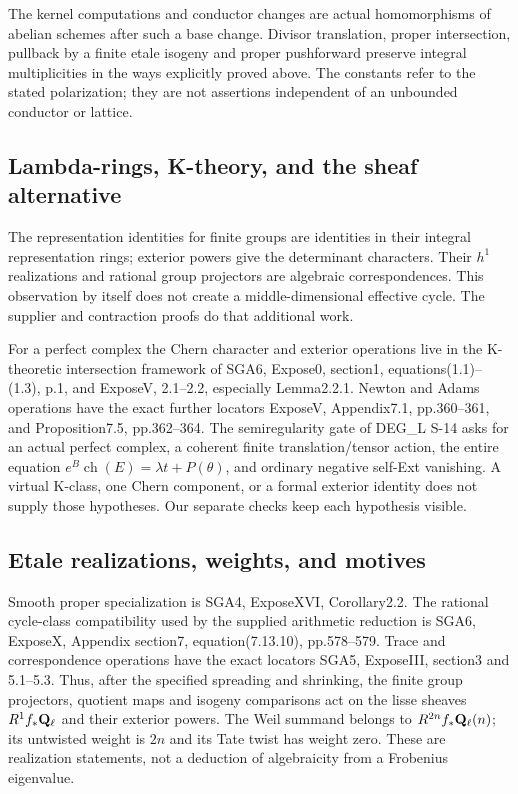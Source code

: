 The kernel computations and conductor changes are actual homomorphisms
of abelian schemes after such a base change. Divisor translation,
proper intersection, pullback by a finite etale isogeny and proper
pushforward preserve integral multiplicities in the ways explicitly
proved above. The constants refer to the stated polarization; they
are not assertions independent of an unbounded conductor or lattice.

\subsection{Lambda-rings, K-theory, and the sheaf alternative}
The representation identities for finite groups are identities in
their integral representation rings; exterior powers give the
determinant characters. Their $h^1$ realizations and rational group
projectors are algebraic correspondences. This observation by itself
does not create a middle-dimensional effective cycle. The supplier
and contraction proofs do that additional work.

For a perfect complex the Chern character and exterior operations live
in the K-theoretic intersection framework of SGA6, Expose0, section1,
equations(1.1)--(1.3), p.1, and ExposeV, 2.1--2.2, especially
Lemma2.2.1. Newton and Adams operations have the exact further
locators ExposeV, Appendix7.1, pp.360--361, and Proposition7.5,
pp.362--364. The semiregularity gate of DEG\_L S-14 asks for an actual
perfect complex, a coherent finite translation/tensor action, the
entire equation $e^B\operatorname{ch}(E)=\lambda t+P(\theta)$, and
ordinary negative self-Ext vanishing. A virtual K-class, one Chern
component, or a formal exterior identity does not supply those
hypotheses. Our separate checks keep each hypothesis visible.

\subsection{Etale realizations, weights, and motives}
Smooth proper specialization is SGA4, ExposeXVI, Corollary2.2.
The rational cycle-class compatibility used by the supplied arithmetic
reduction is SGA6, ExposeX, Appendix section7, equation(7.13.10),
pp.578--579. Trace and correspondence operations have the exact
locators SGA5, ExposeIII, section3 and 5.1--5.3. Thus, after the
specified spreading and shrinking, the finite group projectors,
quotient maps and isogeny comparisons act on the lisse sheaves
$R^1f_*\mathbf Q_\ell$ and their exterior powers. The Weil summand belongs
to $R^{2n}f_*\mathbf Q_\ell(n)$; its untwisted weight is $2n$ and its Tate
twist has weight zero. These are realization statements, not a
deduction of algebraicity from a Frobenius eigenvalue.

